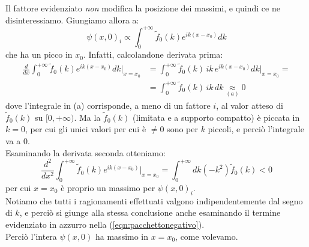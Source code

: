 \documentclass[../../FisicaTeorica.tex]{subfiles}
\begin{document}
Il fattore evidenziato \textit{non} modifica la posizione dei massimi, e quindi ce ne disinteressiamo. Giungiamo allora a:
\begin{equation}
\psi(x,0)_i\propto\int_0^{+\infty}\tilde{f}_0(k)e^{ik(x-x_0)}dk
\label{eqn:pacchetto_max3}
\end{equation}
che ha un picco in $x_0$. Infatti, calcolandone derivata prima:
\begin{align*}
\frac{d}{dx}\int_0^{+\infty}\tilde{f}_0(k)e^{ik(x-x_0)}dk \Big|_{x=x_0}&=\int_0^{+\infty}\tilde{f}_0(k)\,ik\,e^{ik(x-x_0)}dk\Big|_{x=x_0}=\\
&=\int_0^{+\infty} \tilde{f}_0(k)\,ik\,dk \underset{(a)}{\approx} 0
\end{align*}
dove l'integrale in (a) corrisponde, a meno di un fattore $i$, al valor atteso di $\tilde{f}_0(k)$ su $[0,+\infty)$. Ma la $\tilde{f}_0(k)$ (limitata e a supporto compatto) è piccata in $k=0$, per cui gli unici valori per cui è $\neq 0$ sono per $k$ piccoli, e perciò l'integrale va a $0$.\\
Esaminando la derivata seconda otteniamo:
\[
\frac{d^2}{dx^2}\int_0^{+\infty}
\tilde{f}_0(k)e^{ik(x-x_0)}
 \Big|_{x=x_0} = \int_0^{+\infty} dk (-k^2)\tilde{f}_0(k) < 0
\]
per cui $x=x_0$ è proprio un massimo per $\psi(x,0)_i$.\\
Notiamo che tutti i ragionamenti effettuati valgono indipendentemente dal segno di $k$, e perciò si giunge alla stessa conclusione anche esaminando il termine evidenziato in azzurro nella (\ref{eqn:pacchettonegativo}).\\
Perciò l'intera $\psi(x,0)$ ha massimo in $x=x_0$, come volevamo.\\
\end{document}
